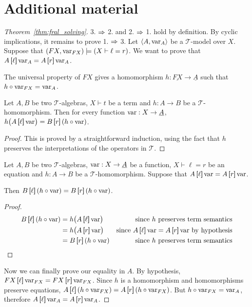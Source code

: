 \appendix
\appendixpage
\addappheadtotoc

\section{Additional material}
\label{sec:additional_fral}

\begin{proof}[Theorem~\ref{thm:fral_solving}]
3. $\Rightarrow$ 2. and 2. $\Rightarrow$ 1. hold by definition. By cyclic implications, it remains to prove 1. $\Rightarrow$ 3. Let $\left\langle A, \operatorname{var}_A \right\rangle$ be a $\mathcal T$-model over $X$. Suppose that $(FX, \operatorname{var}_{FX}) \models (X \vdash \ell = r)$. We want to prove that $A \brak{\ell} \var_A = A \brak{r} \var_A$.

The universal property of $FX$ gives a homomorphism $h : \underline{FX} \to \underline{A}$ such that\\ $h \circ \operatorname{var}_{FX} = \operatorname{var}_A$.
\begin{lemma}
  Let $A, B$ be two $\mathcal{T}$-algebras, $X \vdash t$ be a term and $h : A \to B$ be a $\mathcal{T}$-homomorphism. Then for every function $\operatorname{var} : X \to \underline{A}$, $h \bigl( A \brak{\ell} \var \bigr) = B\brak{r} (h \circ \var)$.
\end{lemma}
\begin{proof}
  This is proved by a straightforward induction, using the fact that $h$ preserves the interpretations of the operators in $\mathcal{T}$.
\end{proof}

\begin{lemma}
  Let $A, B$ be two $\mathcal{T}$-algebras, $\operatorname{var} : X \to \underline{A}$ be a function, $X \vdash \ell = r$ be an equation and $h : A \to B$ be a $\mathcal{T}$-homomorphism. Suppose that $A\brak{\ell} \var = A \brak{r} \var$. 
  
  \noindent Then $B \brak{\ell} (h \circ \var) = B\brak{r} (h \circ \var)$.
\end{lemma}
\begin{proof}
  \begin{align*}
    B \brak{\ell} (h \circ \var) &= h \bigl( A \brak{\ell} \var \bigr) &\text{since $h$ preserves term semantics}\\
    &= h \bigl( A \brak{r} \var \bigr) &\text{since $A \brak{\ell} \var = A \brak{r} \var$ by hypothesis}\\
    &= B \brak{r} (h \circ \var)  &\text{since $h$ preserves term semantics}\\
  \end{align*}
\end{proof}

Now we can finally prove our equality in $A$. By hypothesis, $FX\brak{\ell} \var_{FX} = FX\brak{r} \var_{FX}$. Since $h$ is a homomorphism and homomorphisms preserve equations, $A \brak{\ell} (h \circ \var_{FX}) = A \brak{r} (h \circ \var_{FX})$. But $h \circ \operatorname{var}_{FX} = \operatorname{var}_A$, therefore $A \brak{\ell} \var_A = A \brak{r} \var_A$.
\end{proof}

